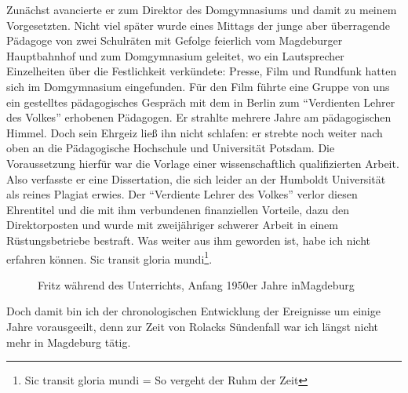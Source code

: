 \documentclass[a5paper,pagesize,10pt,twoside=true]{scrbook}
\renewcommand{\marginpar}[2][]{}
\begin{document}
Zunächst avancierte er zum Direktor des Domgymnasiums und damit zu meinem Vorgesetzten. Nicht viel später wurde eines Mittags der junge aber überragende Pädagoge von zwei Schulräten mit Gefolge feierlich vom Magdeburger Hauptbahnhof und zum Domgymnasium geleitet, wo ein Lautsprecher Einzelheiten über die Festlichkeit \marginpar{152} verkündete: Presse, Film und Rundfunk hatten sich im Domgymnasium eingefunden. Für den Film führte eine Gruppe von uns ein gestelltes pädagogisches Gespräch mit dem in Berlin zum \enquote{Verdienten Lehrer des Volkes} erhobenen Pädagogen. Er strahlte mehrere Jahre am pädagogischen Himmel. Doch sein Ehrgeiz ließ ihn nicht schlafen: er strebte noch weiter nach oben an die Pädagogische Hochschule und Universität Potsdam. Die Voraussetzung hierfür war die Vorlage einer wissenschaftlich qualifizierten Arbeit. Also verfasste er eine Dissertation, die sich leider an der Humboldt Universität als reines Plagiat erwies. Der \enquote{Verdiente Lehrer des Volkes} verlor diesen Ehrentitel und die mit ihm verbundenen finanziellen Vorteile, dazu den Direktorposten und wurde mit zweijähriger schwerer Arbeit in einem Rüstungsbetriebe bestraft. Was weiter aus ihm geworden ist, habe ich nicht erfahren können. Sic transit gloria mundi\footnote{Sic transit gloria mundi = So vergeht der Ruhm der Zeit}.\\

\begin{figure}[t]
	\caption{Fritz während des Unterrichts, Anfang 1950er Jahre in\linebreak Magdeburg}
	\label{fig:unterricht_magdeburg}
\end{figure}

Doch damit bin ich der chronologischen Entwicklung der Ereignisse um einige Jahre vorausgeeilt, denn zur Zeit von Rolacks Sündenfall war ich längst nicht mehr in Magdeburg tätig.
\end{document}
